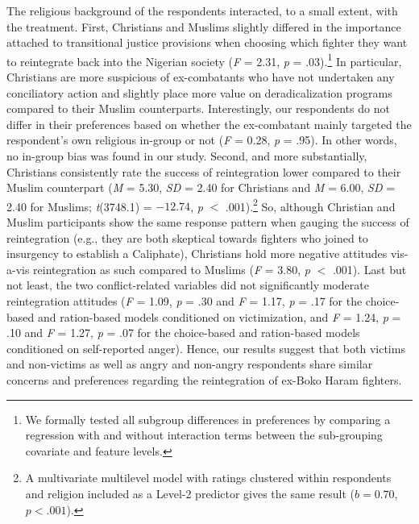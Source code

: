 The religious background of the respondents interacted, to a small extent, with the treatment. First, Christians and Muslims slightly differed in the importance attached to transitional justice provisions when choosing which fighter they want to reintegrate back into the Nigerian society (\textit{F} = 2.31, \textit{p} = .03).\footnote{We formally tested all subgroup differences in preferences by comparing a regression with and without interaction terms between the sub-grouping covariate and feature levels.} In particular, Christians are more suspicious of ex-combatants who have not undertaken any conciliatory action and slightly place more value on deradicalization programs compared to their Muslim counterparts. Interestingly, our respondents do not differ in their preferences based on whether the ex-combatant mainly targeted the respondent's own religious in-group or not (\textit{F} = 0.28, \textit{p} = .95). In other words, no in-group bias was found in our study. Second, and more substantially, Christians consistently rate the success of reintegration lower compared to their Muslim counterpart (\textit{M} = 5.30, \textit{SD} = 2.40 for Christians and \textit{M} = 6.00, \textit{SD} = 2.40 for Muslims; \textit{t}(3748.1) = $-12.74$, \textit{p }$\mathrm{<}$ .001).\footnote{A multivariate multilevel model with ratings clustered within respondents and religion included as a Level-2 predictor gives the same result ($b = 0.70$, $p < .001$).} So, although Christian and Muslim participants show the same response pattern when gauging the success of reintegration (e.g., they are both skeptical towards fighters who joined to insurgency to establish a Caliphate), Christians hold more negative attitudes vis-a-vis reintegration as such compared to Muslims (\textit{F }= 3.80, \textit{p} $\mathrm{<}$ .001). Last but not least, the two conflict-related variables did not significantly moderate reintegration attitudes (\textit{F} = 1.09, \textit{p }= .30 and \textit{F }= 1.17, \textit{p} = .17 for the choice-based and ration-based models conditioned on victimization, and \textit{F} = 1.24, \textit{p }= .10 and \textit{F }= 1.27, \textit{p} = .07 for the choice-based and ration-based models conditioned on self-reported anger). Hence, our results suggest that both victims and non-victims as well as angry and non-angry respondents share similar concerns and preferences regarding the reintegration of ex-Boko Haram fighters.

